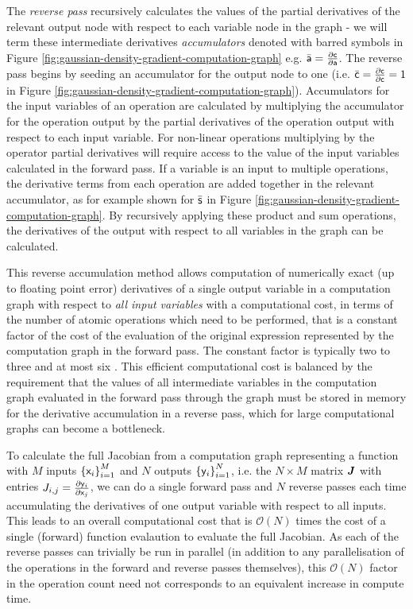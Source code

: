 The \emph{reverse pass} recursively calculates the values of the partial derivatives of the relevant output node with respect to each variable node in the graph - we will term these intermediate derivatives \emph{accumulators} denoted with barred symbols in Figure \ref{fig:gaussian-density-gradient-computation-graph} e.g. $\bar{\mathsf{a}} = \frac{\partial \mathsf{c}}{\partial \mathsf{a}}$. The reverse pass begins by seeding an accumulator for the output node to one (i.e. $\bar{\mathsf{c}} = \frac{\partial \mathsf{c}}{\partial \mathsf{c}} = 1$ in Figure \ref{fig:gaussian-density-gradient-computation-graph}). Accumulators for the input variables of an operation are calculated by multiplying the accumulator for the operation output by the partial derivatives of the operation output with respect to each input variable. For non-linear operations multiplying by the operator partial derivatives will require access to the value of the input variables calculated in the forward pass. If a variable is an input to multiple operations, the derivative terms from each operation are added together in the relevant accumulator, as for example shown for $\bar{\mathsf{s}}$ in Figure \ref{fig:gaussian-density-gradient-computation-graph}. By recursively applying these product and sum operations, the derivatives of the output with respect to all variables in the graph can be calculated.

This reverse accumulation method allows computation of numerically exact (up to floating point error) derivatives of a single output variable in a computation graph with respect to \emph{all input variables} with a computational cost, in terms of the number of atomic operations which need to be performed, that is a constant factor of the cost of the evaluation of the original expression represented by the computation graph in the forward pass. The constant factor is typically two to three and at most six \citep{baydin2015automatic}. This efficient computational cost is balanced by the requirement that the values of all intermediate variables in the computation graph evaluated in the forward pass through the graph must be stored in memory for the derivative accumulation in a reverse pass, which for large computational graphs can become a bottleneck.

To calculate the full Jacobian from a computation graph representing a function with $M$ inputs $\fset{\rvar{x}_i}_{i=1}^M$ and $N$ outputs $\fset{\rvar{y}_i}_{i=1}^N$, i.e. the $N \times M$ matrix $\boldsymbol{J}$ with entries $J_{i,j} = \frac{\partial \mathsf{y}_i}{\partial \mathsf{x}_j}$, we can do a single forward pass and $N$ reverse passes each time accumulating the derivatives of one output variable with respect to all inputs. This leads to an overall computational cost that is $\mathcal{O}(N)$ times the cost of a single (forward) function evalaution to evaluate the full Jacobian. As each of the reverse passes can trivially be run in parallel (in addition to any parallelisation of the operations in the forward and reverse passes themselves), this $\mathcal{O}(N)$ factor in the operation count need not corresponds to an equivalent increase in compute time.

